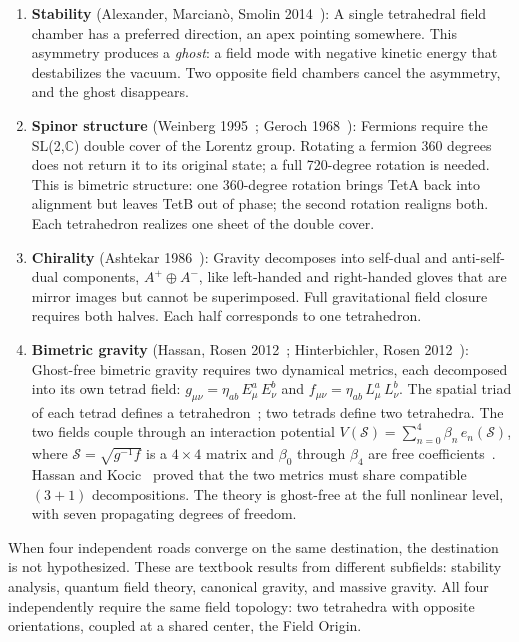 \documentclass[aps,prd,preprint,superscriptaddress,showpacs,preprintnumbers,amsmath,amssymb,nofootinbib]{revtex4-2}
\begin{document}
\begin{enumerate}
\item \textbf{Stability} (Alexander, Marcian\`o, Smolin 2014~\cite{alexander2014}): A single tetrahedral field chamber has a preferred direction, an apex pointing somewhere. This asymmetry produces a \emph{ghost}: a field mode with negative kinetic energy that destabilizes the vacuum. Two opposite field chambers cancel the asymmetry, and the ghost disappears.

\item \textbf{Spinor structure} (Weinberg 1995~\cite{weinberg1995}; Geroch 1968~\cite{geroch1968}): Fermions require the SL(2,$\mathbb{C}$) double cover of the Lorentz group. Rotating a fermion 360 degrees does not return it to its original state; a full 720-degree rotation is needed. This is bimetric structure: one 360-degree rotation brings TetA back into alignment but leaves TetB out of phase; the second rotation realigns both. Each tetrahedron realizes one sheet of the double cover.

\item \textbf{Chirality} (Ashtekar 1986~\cite{ashtekar1986}): Gravity decomposes into self-dual and anti-self-dual components, $A^+ \oplus A^-$, like left-handed and right-handed gloves that are mirror images but cannot be superimposed. Full gravitational field closure requires both halves. Each half corresponds to one tetrahedron.

\item \textbf{Bimetric gravity} (Hassan, Rosen 2012~\cite{hassan2012}; Hinterbichler, Rosen 2012~\cite{hinterbichler2012}): Ghost-free bimetric gravity requires two dynamical metrics, each decomposed into its own tetrad field: $g_{\mu\nu} = \eta_{ab}\,E^a_\mu\,E^b_\nu$ and $f_{\mu\nu} = \eta_{ab}\,L^a_\mu\,L^b_\nu$. The spatial triad of each tetrad defines a tetrahedron~\cite{barbieri1998}; two tetrads define two tetrahedra. The two fields couple through an interaction potential $V(\mathcal{S}) = \sum_{n=0}^{4} \beta_n\,e_n(\mathcal{S})$, where $\mathcal{S} = \sqrt{g^{-1}f}$ is a $4 \times 4$ matrix and $\beta_0$ through $\beta_4$ are free coefficients~\cite{hassan2012}. Hassan and Kocic~\cite{hassankocic2018} proved that the two metrics must share compatible $(3{+}1)$ decompositions. The theory is ghost-free at the full nonlinear level, with seven propagating degrees of freedom.
\end{enumerate}

When four independent roads converge on the same destination, the destination is not hypothesized. These are textbook results from different subfields: stability analysis, quantum field theory, canonical gravity, and massive gravity. All four independently require the same field topology: two tetrahedra with opposite orientations, coupled at a shared center, the Field Origin.
\end{document}
